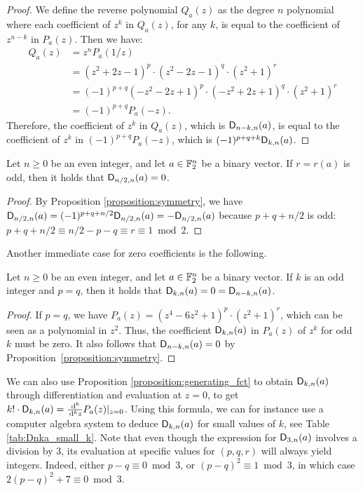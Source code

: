 \documentclass{llncs}
\begin{document}
\begin{proof}
	We define the reverse polynomial  $Q_a(z)$ as the degree $n$ polynomial where each coefficient of $z^k$ in $Q_a(z)$, for any $k$, is equal to the coefficient of $z^{n-k}$ in $P_a(z)$. Then we have:
	\begin{align*}
		Q_a(z)&=z^nP_a(1/z)\\
		&=(z^2+2z-1)^p\cdot(z^2-2z-1)^q\cdot(z^2+1)^r\\
		&=(-1)^{p+q}(-z^2-2z+1)^p\cdot(-z^2+2z+1)^q\cdot(z^2+1)^r\\
		&=(-1)^{p+q}P_a(-z).
	\end{align*}
	Therefore, the coefficient of $z^k$ in $Q_a(z)$, which is $\Dnka n{n-k}a$, is equal to the coefficient of $z^k$ in $(-1)^{p+q}P_a(-z)$, which is $(-1)^{p+q+k}\Dnka nka$.
\end{proof}

\begin{Corollary}
    Let $n\geq 0$ be an even integer, and let $a\in\F_2^n$ be a binary vector. If $r=r(a)$ is odd, then it holds that $\Dnka n{n/2}a=0$.
\end{Corollary}

\begin{proof}
	By Proposition \ref{proposition:symmetry}, we have $\Dnka n{n/2}a=(-1)^{p+q+n/2}\Dnka n{n/2}a=-\Dnka n{n/2}a$ because $p+q+n/2$ is odd: $p+q+n/2\equiv n/2-p-q\equiv r\equiv 1\bmod 2$.
\end{proof}

Another immediate case for zero coefficients is the following.

\begin{proposition}
    Let $n\geq 0$ be an even integer, and let $a\in\F_2^n$ be a binary vector. If $k$ is an odd integer and  $p=q$, then it holds that $\Dnka nka=0=\Dnka n{n-k}a$.
\end{proposition}

\begin{proof}
    If $p=q$, we have $P_a(z)=(z^4-6z^2+1)^p\cdot(z^2+1)^r$, which can be seen as a polynomial in $z^2$. Thus, the coefficient $\Dnka nka$ in $P_a(z)$ of $z^k$ for odd $k$ must be zero. It also follows that $\Dnka n{n-k}a=0$ by Proposition~\ref{proposition:symmetry}.
\end{proof}

\begin{remark}\label{remark:D_nka_differentiation}
    We can also use Proposition \ref{proposition:generating_fct} to obtain $\Dnka nka$ through differentiation and evaluation at $z=0$, to get $k!\cdot\Dnka nka=\frac{\dd^k}{\dd^k z}P_a(z)\vert_{z=0}$. Using this formula, we can for instance use a computer algebra system to deduce $\Dnka nka$ for small values of $k$, see Table \ref{tab:Dnka_small_k}. Note that even though the expression for $\Dnka n3a$ involves a division by $3$, its evaluation at specific values for $(p,q,r)$ will always yield integers. Indeed, either $p-q\equiv 0\bmod 3$, or $(p-q)^2\equiv 1\bmod 3$, in which case $2(p-q)^2+7\equiv 0\bmod 3$.
\end{remark}
\end{document}
